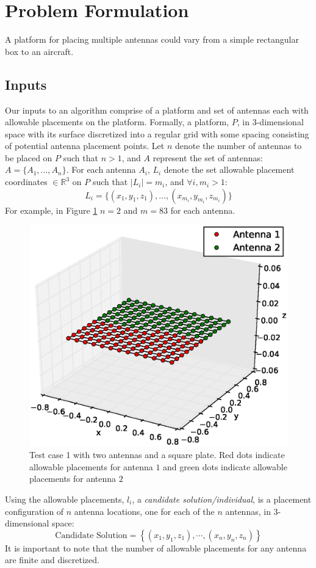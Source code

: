 \documentclass[conference]{IEEEtran}
\begin{document}
\section{Problem Formulation}
\label{sec:problem}
A platform for placing multiple antennas could vary from a simple rectangular box to an aircraft. 
\subsection{Inputs}
\label{sec:inputs}
Our inputs to an algorithm comprise of a platform and set of antennas each with allowable placements on the platform. Formally, a platform, $P$, in 3-dimensional space with its surface discretized into a regular grid with some spacing consisting of potential antenna placement points. Let $n$ denote the number of antennas to be placed on $P$ such that $n>1$, and $A$ represent the set of antennas: $A = \{A_1, ..., A_n\}$. For each antenna $A_i$, $L_i$ denote the set allowable placement coordinates $\in \mathbb R^3$ on $P$ such that $\mid L_i \mid =m_i$, and $ \forall i, m_i>1$:
\[
L_i = \{(x_{1}, y_{1}, z_{1}), ..., (x_{m_i}, y_{m_i}, z_{m_i})\}
\]
For example, in Figure \ref{fig:tc1_figure} $n=2$ and $m=83$ for each antenna.
\begin{figure}
    \begin{center}
        \includegraphics[width=.41\textwidth]{FIG/tc_1_figure}
\end{center}
\caption{Test case 1 with two antennas and a square plate. Red dots indicate allowable placements for antenna $1$ and green dots indicate allowable placements for antenna $2$}
\label{fig:tc1_figure}
\end{figure}
Using the allowable placements, $l_i$, a \textit{candidate solution/individual}, is a placement configuration of $n$ antenna locations, one for each of the $n$ antennas, in 3-dimensional space:
\[
    \text{Candidate Solution}  = \left\{(x_1, y_1, z_1), \cdots, (x_n, y_n, z_n)\right\}
\]
It is important to note that the number of allowable placements for any antenna are finite and discretized. 
\end{document}
